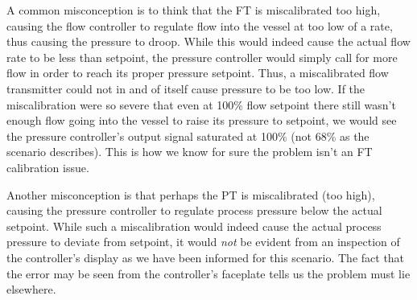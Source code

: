 \vskip 10pt

A common misconception is to think that the FT is miscalibrated too high, causing the flow controller to regulate flow into the vessel at too low of a rate, thus causing the pressure to droop.  While this would indeed cause the actual flow rate to be less than setpoint, the pressure controller would simply call for more flow in order to reach its proper pressure setpoint.  Thus, a miscalibrated flow transmitter could not in and of itself cause pressure to be too low.  If the miscalibration were so severe that even at 100\% flow setpoint there still wasn't enough flow going into the vessel to raise its pressure to setpoint, we would see the pressure controller's output signal saturated at 100\% (not 68\% as the scenario describes).  This is how we know for sure the problem isn't an FT calibration issue.

Another misconception is that perhaps the PT is miscalibrated (too high), causing the pressure controller to regulate process pressure below the actual setpoint.  While such a miscalibration would indeed cause the actual process pressure to deviate from setpoint, it would {\it not} be evident from an inspection of the controller's display as we have been informed for this scenario.  The fact that the error may be seen from the controller's faceplate tells us the problem must lie elsewhere.




